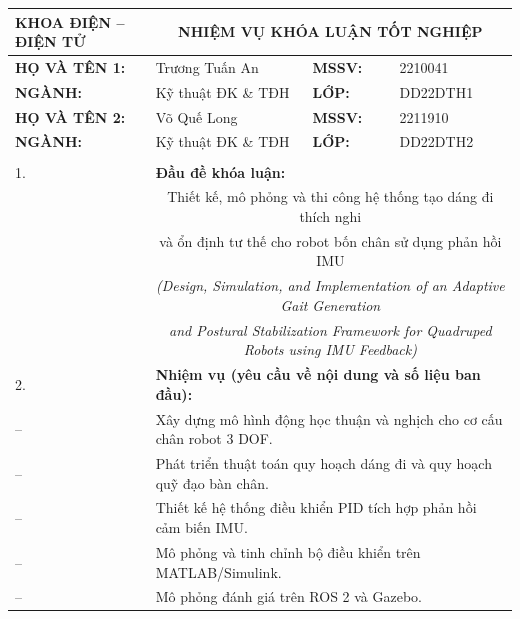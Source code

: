 \documentclass[12pt,a4paper,oneside]{extbook}
\begin{document}
{\footnotesize
{\setlength{\tabcolsep}{3pt}
\renewcommand{\arraystretch}{0.95}
\noindent
\begin{tabular}{|p{}|p{}|p{}|p{}|p{}|}
\hline
\multicolumn{2}{|l|}{\textbf{KHOA ĐIỆN -- ĐIỆN TỬ}} &
\multicolumn{3}{c|}{\fontsize{13pt}{15.6pt}\selectfont \textbf{NHIỆM VỤ KHÓA LUẬN TỐT NGHIỆP}} \\
\hline
\multicolumn{2}{|l|}{\textbf{HỌ VÀ TÊN 1:}} & Trương Tuấn An & \textbf{MSSV:} & 2210041 \\
\hline
\multicolumn{2}{|l|}{\textbf{NGÀNH:}} & Kỹ thuật ĐK \& TĐH & \textbf{LỚP:} & DD22DTH1 \\
\hline
\multicolumn{2}{|l|}{\textbf{HỌ VÀ TÊN 2:}} & Võ Quế Long & \textbf{MSSV:} & 2211910 \\
\hline
\multicolumn{2}{|l|}{\textbf{NGÀNH:}} & Kỹ thuật ĐK \& TĐH & \textbf{LỚP:} & DD22DTH2 \\
\hline
\multicolumn{5}{|l|}{} \\
\hline
1. & \multicolumn{4}{l|}{\textbf{Đầu đề khóa luận:}} \\
& \multicolumn{4}{c|}{Thiết kế, mô phỏng và thi công hệ thống tạo dáng đi thích nghi} \\
& \multicolumn{4}{c|}{và ổn định tư thế cho robot bốn chân sử dụng phản hồi IMU} \\
& \multicolumn{4}{c|}{\textit{(Design, Simulation, and Implementation of an Adaptive Gait Generation}} \\
& \multicolumn{4}{c|}{\textit{and Postural Stabilization Framework for Quadruped Robots using IMU Feedback)}} \\
\hline
2. & \multicolumn{4}{l|}{\textbf{Nhiệm vụ (yêu cầu về nội dung và số liệu ban đầu):}} \\
\hline
-- & \multicolumn{4}{l|}{Xây dựng mô hình động học thuận và nghịch cho cơ cấu chân robot 3 DOF.} \\
\hline
-- & \multicolumn{4}{l|}{Phát triển thuật toán quy hoạch dáng đi và quy hoạch quỹ đạo bàn chân.} \\
\hline
-- & \multicolumn{4}{l|}{Thiết kế hệ thống điều khiển PID tích hợp phản hồi cảm biến IMU.} \\
\hline
-- & \multicolumn{4}{l|}{Mô phỏng và tinh chỉnh bộ điều khiển trên MATLAB/Simulink.} \\
\hline
-- & \multicolumn{4}{l|}{Mô phỏng đánh giá trên ROS 2 và Gazebo.} \\

\end{tabular}}}
\end{document}
